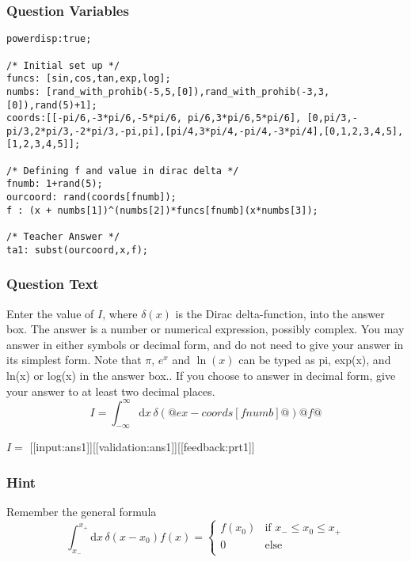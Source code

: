\documentclass[a4paper,10pt]{article}
\begin{document}
\subsubsection{Question Variables}
\begin{lstlisting}
powerdisp:true;

/* Initial set up */
funcs: [sin,cos,tan,exp,log];
numbs: [rand_with_prohib(-5,5,[0]),rand_with_prohib(-3,3,[0]),rand(5)+1];
coords:[[-pi/6,-3*pi/6,-5*pi/6, pi/6,3*pi/6,5*pi/6], [0,pi/3,-pi/3,2*pi/3,-2*pi/3,-pi,pi],[pi/4,3*pi/4,-pi/4,-3*pi/4],[0,1,2,3,4,5], [1,2,3,4,5]];

/* Defining f and value in dirac delta */
fnumb: 1+rand(5);
ourcoord: rand(coords[fnumb]);
f : (x + numbs[1])^(numbs[2])*funcs[fnumb](x*numbs[3]);

/* Teacher Answer */
ta1: subst(ourcoord,x,f);
\end{lstlisting}
\subsubsection{Question Text}
Enter the value of $I$, where \(\delta(x)\) is the Dirac delta-function, into the answer box. The answer is a number or numerical expression, possibly complex. You may answer in either symbols or decimal form, and do not need to give your answer in its simplest form. Note that $\pi$, \(e^{x}\) and $\ln(x)$ can be typed as pi, exp(x), and ln(x) or log(x) in the answer box.. If you choose to answer in decimal form, give your answer to at least two decimal places. \[ I = \int_{-\infty}^{\infty} \text{d}x \, \delta\left(@ex-coords[fnumb]@\right)@f@ \]

$I = $ [[input:ans1]][[validation:ans1]][[feedback:prt1]]
\subsubsection{Hint}
Remember the general formula \[ \int_{x_{-}}^{x_{+}} \text{d}x \, \delta\left(x-x_0\right)f(x) = \begin{cases} f(x_0) & \text{if } x_{-}\leq x_{0} \leq x_{+} \\ 0 & \text{else} \\ \end{cases} \]
\end{document}
